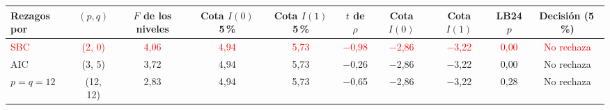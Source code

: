 \begin{tabular}{lccccccccc}
\toprule
Rezagos por & $(p,q)$ & $F$ de los niveles & Cota $I(0)$ 5\,\% & Cota $I(1)$ 5\,\% & $t$ de $\rho$ & Cota $I(0)$ & Cota $I(1)$ & LB24 $p$ & Decisi\'on (5\,\%)
\\ \midrule
\textcolor{red}{SBC} & \textcolor{red}{(2, 0)} & \textcolor{red}{4{,}06} & \textcolor{red}{4{,}94} & \textcolor{red}{5{,}73} & \textcolor{red}{\ensuremath{-}0{,}98} & \textcolor{red}{\ensuremath{-}2{,}86} & \textcolor{red}{\ensuremath{-}3{,}22} & \textcolor{red}{0{,}00} & \textcolor{red}{No rechaza} \\
AIC & (3, 5) & 3{,}72 & 4{,}94 & 5{,}73 & \ensuremath{-}0{,}26 & \ensuremath{-}2{,}86 & \ensuremath{-}3{,}22 & 0{,}00 & No rechaza \\
$p=q=12$ & (12, 12) & 2{,}83 & 4{,}94 & 5{,}73 & \ensuremath{-}0{,}65 & \ensuremath{-}2{,}86 & \ensuremath{-}3{,}22 & 0{,}28 & No rechaza \\
\bottomrule
\end{tabular}
